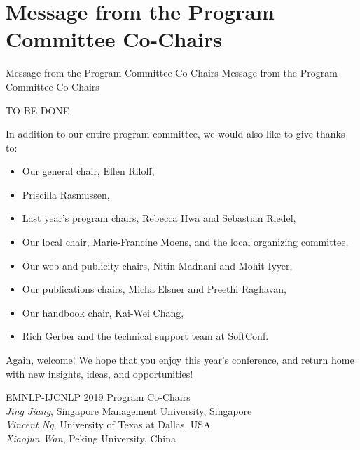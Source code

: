 \section{Message from the Program Committee Co-Chairs}
\setheaders%
    {Message from the Program Committee Co-Chairs}%
    {Message from the Program Committee Co-Chairs}
\thispagestyle{emptyheader}


\setlength{\parskip}{.7ex}

TO BE DONE


\clearpage

In addition to our entire program committee, we would also like to give thanks to:

\begin{itemize}
    \item         Our general chair, Ellen Riloff,
    \item Priscilla Rasmussen,
    \item Last year's program chairs, Rebecca Hwa and Sebastian Riedel,
    \item Our local chair, Marie-Francine Moens, and the local organizing committee,
\item Our web and publicity chairs, Nitin Madnani and Mohit Iyyer,
\item Our publications chairs, Micha Elsner and Preethi Raghavan,
\item Our handbook chair, Kai-Wei Chang,
\item Rich Gerber and the technical support team at SoftConf.
\end{itemize}
Again, welcome! We hope that you enjoy this year's conference, and return home with new insights, ideas, and opportunities!

\vspace{3em}

\noindent EMNLP-IJCNLP 2019 Program Co-Chairs \\



 
	

 
	


\noindent \textit{Jing Jiang}, Singapore Management University, Singapore \\
\noindent \textit{Vincent Ng}, University of Texas at Dallas, USA\\
\noindent \textit{Xiaojun Wan}, Peking University, China

